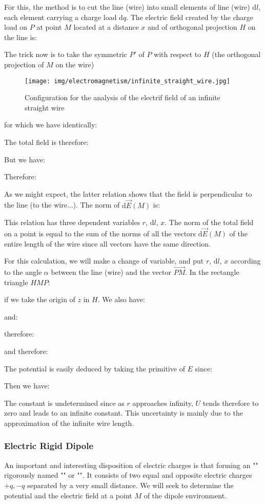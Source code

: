 	For this, the method is to cut the line (wire) into small elements of line (wire) $\mathrm{d}l$, each element carrying a charge load $\mathrm{d}q$.  The electric field created by the charge load on $P$ at point $M$ located at a distance $x$ and of orthogonal projection $H$ on the line is:
	
	The trick now is to take the symmetric $P'$ of $P$ with respect to $H$ (the orthogonal projection of $M$ on the wire)
	\begin{figure}[H]
		\centering
		\texttt{[image: img/electromagnetism/infinite\_straight\_wire.jpg]}
		\caption{Configuration for the analysis of the electrif field of an infinite straight wire}
	\end{figure}
	for which we have identically:
	
	The total field is therefore:
	
	But we have:
	
	Therefore:
	
	As we might expect, the latter relation shows that the field is perpendicular to the line (to the wire...).
	The norm of $\mathrm{d}\vec{E}(M)$ is:
	
	This relation has three dependent variables $r$, $\mathrm{d}l$, $x$. The norm of the total field on a point is equal to the sum of the norms of all the vectors $\mathrm{d}\vec{E}(M)$ of the entire length of the wire since all vectors have the same direction.
	
	For this calculation, we will make a change of variable, and put $r$, $\mathrm{d}l$, $x$ according to the angle $\alpha$ between the line (wire) and the vector $\overrightarrow{PM}$. In the rectangle triangle $HMP$:
	
	if we take the origin of $z$ in $H$. We also have:
	
	and:
	
	therefore:
	
	
	and therefore:
	
	The potential is easily deduced by taking the primitive of $E$ since:
	
	Then we have:
	
	The constant is undetermined since as $r$ approaches infinity, $U$ tends therefore to zero and leads to an infinite constant. This uncertainty is mainly due to the approximation of the infinite wire length.

	\subsubsection{Electric Rigid Dipole}
	An important and interesting disposition of electric charges is that forming an "" rigorously named "" or "". It consists of two equal and opposite electric charges $+ q, -q$ separated by a very small distance. We will seek to determine the potential and the electric field at a point $M$ of the dipole environment.
	
